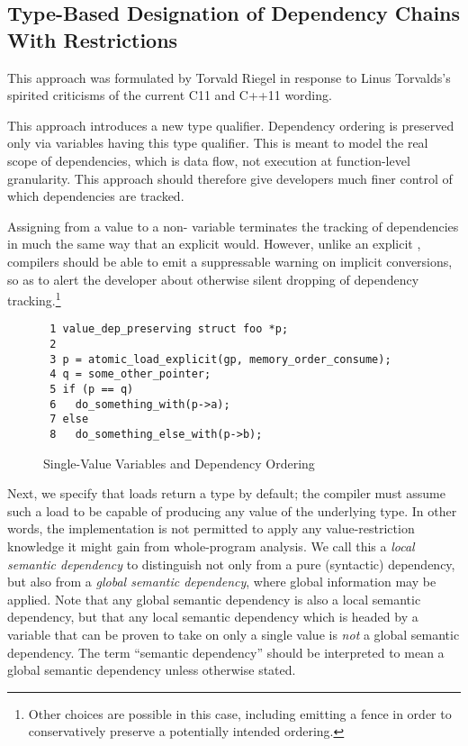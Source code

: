 \documentclass[letterpaper,twocolumn,10pt]{article}
\begin{document}
\subsection{Type-Based Designation of Dependency Chains With Restrictions}
\label{sec:Type-Based Designation of Dependency Chains With Restrictions}

This approach was formulated by Torvald Riegel in response to
Linus Torvalds's spirited criticisms of the current C11 and C++11
wording.

This approach introduces a new  type
qualifier.
Dependency ordering is preserved only via variables having
this type qualifier.
This is meant to model the real scope of dependencies, which is
data flow, not execution at function-level granularity.
This approach should therefore give developers much finer
control of which dependencies are tracked.

Assigning from a  value to a
non- variable terminates the tracking
of dependencies in much the same way that an explicit
 would.
However, unlike an explicit , compilers should
be able to emit a suppressable warning on implicit conversions, so as
to alert the developer about otherwise silent dropping of dependency
tracking.\footnote{
	Other choices are possible in this case, including emitting
	a  fence in order to conservatively
	preserve a potentially intended ordering.}

\begin{figure}[tbp]
{ \scriptsize
\begin{verbatim}
 1 value_dep_preserving struct foo *p;
 2 
 3 p = atomic_load_explicit(gp, memory_order_consume);
 4 q = some_other_pointer;
 5 if (p == q)
 6   do_something_with(p->a);
 7 else
 8   do_something_else_with(p->b);
\end{verbatim}
}
\caption{Single-Value Variables and Dependency Ordering}
\label{fig:Single-Value Variables and Dependency Ordering}
\end{figure}

Next, we specify that  loads return a
 type by default; the compiler must assume
such a load to be capable of producing any value of the underlying type.
In other words, the implementation is not permitted to apply any
value-restriction knowledge it might gain from whole-program
analysis.
We call this a \emph{local semantic dependency} to distinguish not only
from a pure (syntactic) dependency, but also from a
\emph{global semantic dependency}, where global information may be applied.
Note that any global semantic dependency is also a local semantic
dependency, but that any local semantic dependency which is headed
by a variable that can be proven to take on only a single value is
\emph{not} a global semantic dependency.
The term ``semantic dependency'' should be interpreted to mean a
global semantic dependency unless otherwise stated.
\end{document}
